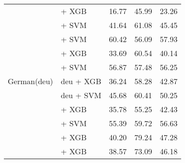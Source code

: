 \begin{longtable}{llccc}
    \midrule
    \multirow{11}{*}{German(deu)}         & \citep{all-MiniLM-L12-v2}  + XGB                                   & 16.77                                & 45.99              & 23.26             \\
                                          & \citep{heinz2023e5basestsende} + SVM                               & 41.64                                & 61.08              & 45.45             \\
                                          & \citep{wang2024multilingual} + SVM                                 & 60.42                                & 56.09              & 57.93             \\
                                          & \citep{chan2020germanslanguagemodel} + XGB                         & 33.69                                & 60.54              & 40.14             \\
                                          & \citep{chibb2023germansemanticsts} + SVM                           & 56.87                                & 57.48              & 56.25             \\
                                          & \citep{mohr2024multi} deu + XGB                                    & 36.24                                & 58.28              & 42.87             \\
                                          & \citep{mohr2024multi} deu + SVM                                    & 45.68                                & 60.41              & 50.25             \\
                                          & \citep{sturua2024jinaembeddingsv3multilingualembeddingstask} + XGB & 35.78                                & 55.25              & 42.43             \\
                                          & \citep{sturua2024jinaembeddingsv3multilingualembeddingstask} + SVM & 55.39                                & 59.72              & 56.63             \\
                                          & \citep{ni2021sentencet5scalablesentenceencoders} + XGB             & 40.20                                 & 79.24              & 47.28             \\
                                          & \citep{wang2023improving} + XGB                                    & 38.57                                & 73.09              & 46.18             \\
    \midrule

\end{longtable}
